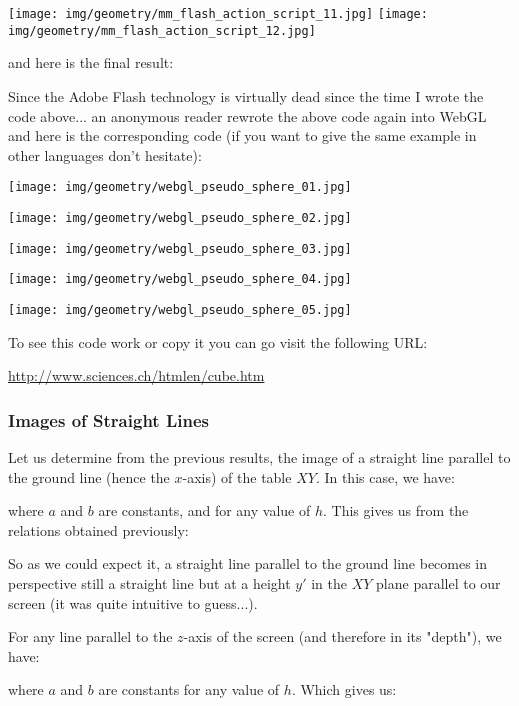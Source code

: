 	\begin{tcolorbox}[colframe=black,colback=white,sharp corners]
	\texttt{[image: img/geometry/mm\_flash\_action\_script\_11.jpg]}
	\texttt{[image: img/geometry/mm\_flash\_action\_script\_12.jpg]}
	
	and here is the final result:
	\begin{center}
	\centering
	\end{center}
	\end{tcolorbox}
	Since the Adobe Flash technology is virtually dead since the time I wrote the code above... an anonymous reader rewrote the above code again into WebGL and here is the corresponding code (if you want to give the same example in other languages don't hesitate):
	
	\texttt{[image: img/geometry/webgl\_pseudo\_sphere\_01.jpg]}
	
	\texttt{[image: img/geometry/webgl\_pseudo\_sphere\_02.jpg]}
	
	\texttt{[image: img/geometry/webgl\_pseudo\_sphere\_03.jpg]}
	
	\texttt{[image: img/geometry/webgl\_pseudo\_sphere\_04.jpg]}
	
	\texttt{[image: img/geometry/webgl\_pseudo\_sphere\_05.jpg]}
	
	To see this code work or copy it you can go visit the following URL:
	\begin{center}
	\url{http://www.sciences.ch/htmlen/cube.htm}
	\end{center}
	
	\subsubsection{Images of Straight Lines}
	Let us determine from the previous results, the image of a straight line parallel to the ground line (hence the $x$-axis) of the table $XY$. In this case, we have:
	
	where $a$ and $b$ are constants, and for any value of $h$. This gives us from the relations obtained previously:
	
	So as we could expect it, a straight line parallel to the ground line becomes in perspective still a straight line but at a height $y'$ in the $XY$ plane parallel to our screen (it was quite intuitive to guess...).

	For any line parallel to the $z$-axis of the screen (and therefore in its "depth"), we have:
	
	where $a$ and $b$ are constants for any value of $h$. Which gives us:
	
